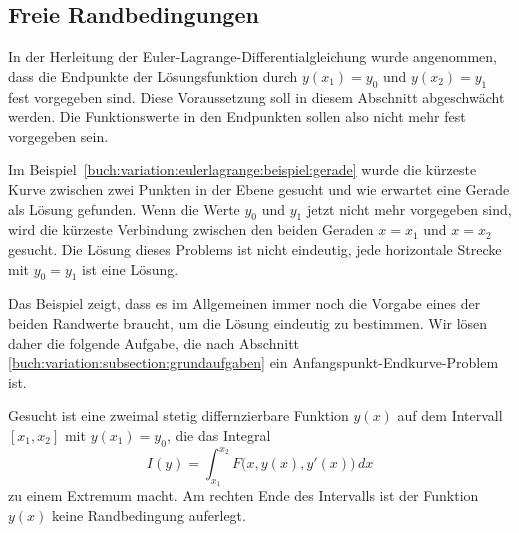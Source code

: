 %
%
%

%
%
\subsection{Freie Randbedingungen
\label{buch:variation:eulerlagrange:subsection:freierb}}
In der Herleitung der Euler-Lagrange-Differentialgleichung wurde angenommen,
dass die Endpunkte der Lösungsfunktion durch $y(x_1)=y_0$ und $y(x_2)=y_1$
fest vorgegeben sind.
Diese Voraussetzung soll in diesem Abschnitt abgeschwächt werden.
Die Funktionswerte in den Endpunkten sollen also nicht mehr fest
vorgegeben sein.

\begin{beispiel}
\label{buch:variation:eulerlagrange:beispiel:freiegerade}
Im Beispiel~\ref{buch:variation:eulerlagrange:beispiel:gerade}
wurde die kürzeste Kurve zwischen zwei Punkten in der Ebene
gesucht und wie erwartet eine Gerade als Lösung gefunden.
Wenn die Werte $y_0$ und $y_1$ jetzt nicht mehr vorgegeben sind,
wird die kürzeste Verbindung zwischen den beiden Geraden
$x=x_1$ und $x=x_2$ gesucht.
Die Lösung dieses Problems ist nicht eindeutig, jede horizontale
Strecke mit $y_0=y_1$ ist eine Lösung.
\end{beispiel}

Das Beispiel zeigt, dass es im Allgemeinen immer noch die Vorgabe
eines der beiden Randwerte braucht, um die Lösung eindeutig zu
bestimmen.
Wir lösen daher die folgende Aufgabe, die nach
Abschnitt \ref{buch:variation:subsection:grundaufgaben}
ein Anfangspunkt-Endkurve-Problem ist.

\begin{aufgabe}
Gesucht ist eine zweimal stetig differnzierbare Funktion $y(x)$ auf
dem Intervall $[x_1,x_2]$ mit $y(x_1)=y_0$, die das Integral
\[
I(y)
=
\int_{x_1}^{x_2} F\bigl(x,y(x),y'(x)\bigr)\,dx
\]
zu einem Extremum macht.
Am rechten Ende des Intervalls ist der Funktion $y(x)$ keine
Randbedingung auferlegt.
\end{aufgabe}

